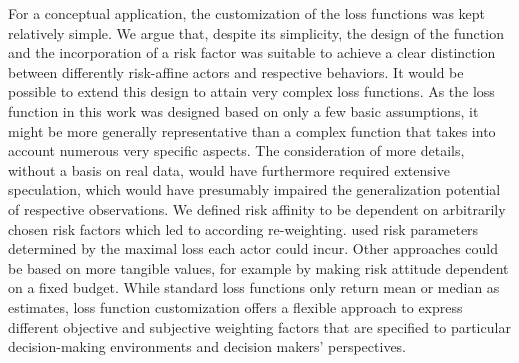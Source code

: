 	For a conceptual application, the customization of the loss functions was kept relatively simple. We argue that, despite its simplicity, the design of the function and the incorporation of a risk factor was suitable to achieve a clear distinction between differently risk-affine actors and respective behaviors. It would be possible to extend this design to attain very complex loss functions. As the loss function in this work was designed based on only a few basic assumptions, it might be more generally representative than a complex function that takes into account numerous very specific aspects. The consideration of more details, without a basis on real data, would have furthermore required extensive speculation, which would have presumably impaired the generalization potential of respective observations. We defined risk affinity to be dependent on arbitrarily chosen risk factors which led to according re-weighting. \citet{davidson2015} used risk parameters determined by the maximal loss each actor could incur. Other approaches could be based on more tangible values, for example by making risk attitude dependent on a fixed budget. While standard loss functions only return mean or median as estimates, loss function customization offers a flexible approach to express different objective and subjective weighting factors that are specified to particular decision-making environments and decision makers' perspectives.
